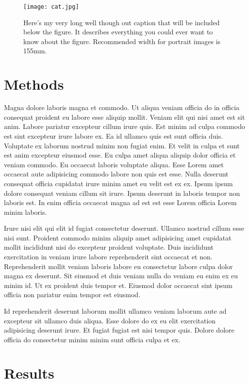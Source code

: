\begin{figure}[tb]
  \centering
  \texttt{[image: cat.jpg]}
    \caption[A brief caption for the list of figures in the front matter.]{Here's my very long well though out caption that will be included below the figure. It describes everything you could ever want to know about the figure. Recommended width for portrait images is 155mm.}
  \label{fig:cat}
\end{figure}

\section{Methods}
Magna dolore laboris magna et commodo. Ut aliqua veniam officia do in officia consequat proident eu labore esse aliquip mollit. Veniam elit qui nisi amet est sit anim. Labore pariatur excepteur cillum irure quis. Est minim ad culpa commodo est sint excepteur irure labore ex.
Ea id ullamco quis est sunt officia duis. Voluptate ex laborum nostrud minim non fugiat enim. Et velit in culpa et sunt est anim excepteur eiusmod esse. Eu culpa amet aliqua aliquip dolor officia et veniam commodo.
Eu occaecat laboris voluptate aliqua. Esse Lorem amet occaecat aute adipisicing commodo labore non quis est esse. Nulla deserunt consequat officia cupidatat irure minim amet eu velit est ex ex. Ipsum ipsum dolore consequat veniam cillum sit irure. Ipsum deserunt in laboris tempor non laboris est. In enim officia occaecat magna ad est est esse Lorem officia Lorem minim laboris.

Irure nisi elit qui elit id fugiat consectetur deserunt. Ullamco nostrud cillum esse nisi sunt. Proident commodo minim aliquip amet adipisicing amet cupidatat mollit incididunt nisi do excepteur proident voluptate. Duis incididunt exercitation in veniam irure labore reprehenderit sint occaecat et non.
Reprehenderit mollit veniam laboris labore eu consectetur labore culpa dolor magna ex deserunt. Sit eiusmod et duis veniam nulla do veniam eu enim ex eu minim id. Ut ex proident duis tempor et. Eiusmod dolor occaecat sint ipsum officia non pariatur enim tempor est eiusmod.

Id reprehenderit deserunt laborum mollit ullamco veniam laborum aute ad excepteur sit ullamco duis aliqua. Esse dolore do ex eu elit exercitation adipisicing deserunt irure. Et fugiat fugiat est nisi tempor quis. Dolore dolore officia do consectetur minim minim sunt officia culpa et ex.
\section{Results}
  
